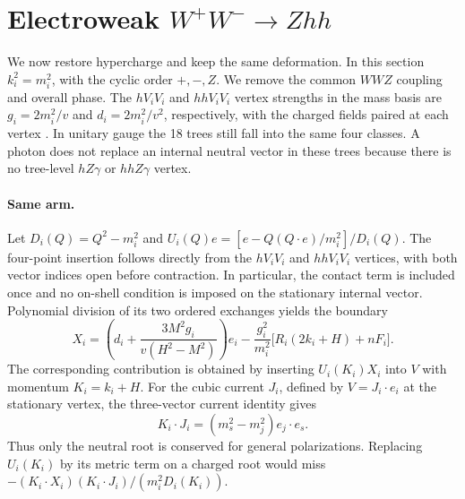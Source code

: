 \documentclass[11pt,a4paper]{article}
\begin{document}
\section{Electroweak \texorpdfstring{\(W^+W^-\to Zhh\)}{W+W- to Zhh}}
We now restore hypercharge and keep the same deformation. In this
section \(k_i^2=m_i^2\), with the cyclic order \(+,-,Z\). We remove
the common \(WWZ\) coupling and overall phase. The \(hV_iV_i\) and
\(hhV_iV_i\) vertex strengths in the mass basis are \(g_i=2m_i^2/v\)
and \(d_i=2m_i^2/v^2\), respectively, with the charged fields paired
at each vertex \cite{Denner}. In unitary gauge the 18 trees still fall
into the same four classes. A photon does not replace an internal
neutral vector in these trees because there is no tree-level
\(hZ\gamma\) or \(hhZ\gamma\) vertex.

\paragraph{Same arm.}
Let \(D_i(Q)=Q^2-m_i^2\) and
\(U_i(Q)e=[e-Q(Q\cdot e)/m_i^2]/D_i(Q)\).
The four-point insertion follows directly from the \(hV_iV_i\)
and \(hhV_iV_i\) vertices, with both vector indices open before
contraction. In particular, the contact term is included once and
no on-shell condition is imposed on the stationary internal vector.
Polynomial division of its two ordered exchanges yields the boundary
\begin{equation}
 X_i=\left(d_i+\frac{3M^2 g_i}{v(H^2-M^2)}\right)e_i
      -\frac{g_i^2}{m_i^2}\bigl[R_i(2k_i+H)+nF_i\bigr] .
 \label{eq:ew-x}
\end{equation}
The corresponding contribution is obtained by inserting
\(U_i(K_i)X_i\) into \(V\) with momentum \(K_i=k_i+H\).
For the cubic current \(J_i\), defined by \(V=J_i\cdot e_i\) at the
stationary vertex, the three-vector current identity
\cite[Eq.~(19)]{Ke} gives
\begin{equation}
 K_i\cdot J_i=(m_s^2-m_j^2)e_j\cdot e_s.
 \label{eq:ew-root}
\end{equation}
Thus only the neutral root is conserved for general polarizations.
Replacing \(U_i(K_i)\) by its metric term on a charged root would
miss \(- (K_i\cdot X_i)(K_i\cdot J_i)/(m_i^2 D_i(K_i))\).
\end{document}
